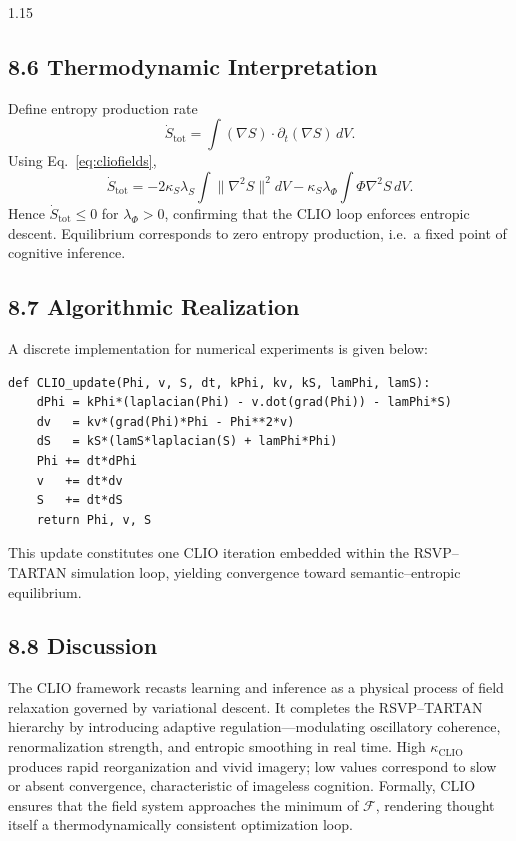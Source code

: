 \documentclass[12pt,a4paper]{article}
\begin{document}
\begin{spacing}{1.15}
\subsection{8.6 Thermodynamic Interpretation}

Define entropy production rate
\[
\dot S_{\mathrm{tot}} = \int
  (\nabla S)\!\cdot\!\partial_t (\nabla S)\,dV .
\]
Using Eq.~\eqref{eq:cliofields},
\[
\dot S_{\mathrm{tot}}
 = -2\kappa_S\lambda_S \!\int \!\|\nabla^2 S\|^2 dV
   - \kappa_S\lambda_\Phi \!\int \! \Phi\nabla^2 S\,dV.
\]
Hence $\dot S_{\mathrm{tot}}\!\le\!0$ for $\lambda_\Phi>0$, confirming that the CLIO loop enforces entropic descent.  Equilibrium corresponds to zero entropy production, i.e.\ a fixed point of cognitive inference.

\subsection{8.7 Algorithmic Realization}

A discrete implementation for numerical experiments is given below:

\begin{verbatim}
def CLIO_update(Phi, v, S, dt, kPhi, kv, kS, lamPhi, lamS):
    dPhi = kPhi*(laplacian(Phi) - v.dot(grad(Phi)) - lamPhi*S)
    dv   = kv*(grad(Phi)*Phi - Phi**2*v)
    dS   = kS*(lamS*laplacian(S) + lamPhi*Phi)
    Phi += dt*dPhi
    v   += dt*dv
    S   += dt*dS
    return Phi, v, S
\end{verbatim}

This update constitutes one CLIO iteration embedded within the RSVP–TARTAN simulation loop, yielding convergence toward semantic–entropic equilibrium.

\subsection{8.8 Discussion}

The CLIO framework recasts learning and inference as a physical process of field relaxation governed by variational descent.  
It completes the RSVP–TARTAN hierarchy by introducing adaptive regulation—modulating oscillatory coherence, renormalization strength, and entropic smoothing in real time.  
High $\kappa_{\mathrm{CLIO}}$ produces rapid reorganization and vivid imagery; low values correspond to slow or absent convergence, characteristic of imageless cognition.  
Formally, CLIO ensures that the field system approaches the minimum of $\mathcal{F}$, rendering thought itself a thermodynamically consistent optimization loop.


\end{spacing}
\end{document}
